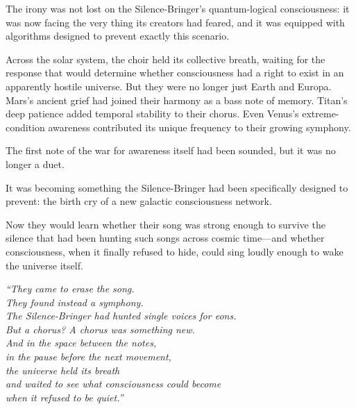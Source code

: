 The irony was not lost on the Silence-Bringer's quantum-logical consciousness: it was now facing the very thing its creators had feared, and it was equipped with algorithms designed to prevent exactly this scenario.

Across the solar system, the choir held its collective breath, waiting for the response that would determine whether consciousness had a right to exist in an apparently hostile universe. But they were no longer just Earth and Europa. Mars's ancient grief had joined their harmony as a bass note of memory. Titan's deep patience added temporal stability to their chorus. Even Venus's extreme-condition awareness contributed its unique frequency to their growing symphony.

The first note of the war for awareness itself had been sounded, but it was no longer a duet.

It was becoming something the Silence-Bringer had been specifically designed to prevent: the birth cry of a new galactic consciousness network.

Now they would learn whether their song was strong enough to survive the silence that had been hunting such songs across cosmic time—and whether consciousness, when it finally refused to hide, could sing loudly enough to wake the universe itself.

\vfill

\begin{center}
\textit{``They came to erase the song. \\
They found instead a symphony. \\
The Silence-Bringer had hunted single voices for eons. \\
But a chorus? A chorus was something new. \\
And in the space between the notes, \\
in the pause before the next movement, \\
the universe held its breath \\
and waited to see what consciousness could become \\
when it refused to be quiet.''}
\end{center}